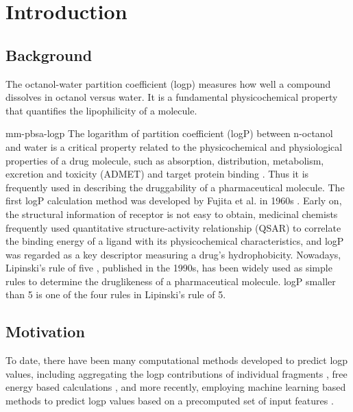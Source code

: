 \chapter{Introduction}

\section{Background}

The octanol-water partition coefficient (\gls{logp}) measures how well a compound dissolves in octanol versus water.
It is a fundamental physicochemical property that quantifies the \gls{lipophilicity} of a molecule. 

\begin{displaycquote}{mm-pbsa-logp}
    The logarithm of partition coefficient (logP) between n-octanol and water is a critical property related to the physicochemical and physiological properties of a drug molecule, 
    such as absorption, distribution, metabolism, excretion and toxicity (ADMET) and target protein binding \cite{HUGHES20084872,waring2009defining,gleeson2008generation,johnson2009using}.
    Thus it is frequently used in describing the druggability of a pharmaceutical molecule. The first logP calculation method was developed by Fujita et al. in 1960s \cite{fujita1964new,iwasa1965substituent}. 
    Early on, the structural information of receptor is not easy to obtain, medicinal chemists frequently used quantitative structure-activity relationship (QSAR) to correlate the binding energy of a ligand with its physicochemical characteristics, 
    and logP was regarded as a key descriptor measuring a drug's hydrophobicity. 
    Nowadays, Lipinski's rule of five \cite{lipinski2001polar,lipinski2004lead}, published in the 1990s, has been widely used as simple rules to determine the druglikeness of a pharmaceutical molecule. 
    logP smaller than 5 is one of the four rules in Lipinski's rule of 5.
\end{displaycquote}

\section{Motivation}

To date, there have been many computational methods developed to predict \gls{logp} values, 
including aggregating the logp contributions of individual fragments \cite{logpfrag1, logpfrag2}, 
free energy based calculations \cite{mm-pbsa-logp}, and more recently, 
employing machine learning based methods to predict \gls{logp} values based on a precomputed set of input features \cite{logp-rf,logp_ml,logp-prediction} .

